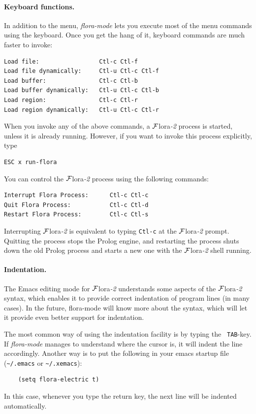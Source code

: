 \documentclass[11pt]{article}
\newcommand{\FLORA}{{\mbox{\sc ${\cal F}${lora}\rm\emph{-2}}}\xspace}
\begin{document}
\paragraph{Keyboard functions.}
In addition to the menu, \emph{flora-mode} lets you execute most of the
menu commands using the keyboard. Once you get the hang of it, keyboard
commands are much faster to invoke:
\begin{verbatim}
Load file:                 Ctl-c Ctl-f
Load file dynamically:     Ctl-u Ctl-c Ctl-f
Load buffer:               Ctl-c Ctl-b
Load buffer dynamically:   Ctl-u Ctl-c Ctl-b
Load region:               Ctl-c Ctl-r
Load region dynamically:   Ctl-u Ctl-c Ctl-r
\end{verbatim}
When you invoke any of the above commands, a \FLORA process is started,
unless it is already running. However, if you want to invoke this process
explicitly, type
\begin{verbatim}
ESC x run-flora  
\end{verbatim}
You can control the \FLORA process using the following commands:
\begin{verbatim}
Interrupt Flora Process:      Ctl-c Ctl-c
Quit Flora Process:           Ctl-c Ctl-d
Restart Flora Process:        Ctl-c Ctl-s
\end{verbatim}
Interrupting \FLORA is equivalent to typing {\tt Ctl-c} at the \FLORA
prompt. Quitting the process stops the Prolog engine, and restarting the
process shuts down the old Prolog process and starts a new one with the \FLORA
shell running. 

\paragraph{Indentation.}
The Emacs editing mode for \FLORA
understands some aspects of the \FLORA syntax, which
enables it to provide correct indentation of program lines (in many cases).
In the future, flora-mode will know more about the syntax, which will let
it provide even better support for indentation.

The most common way of using the indentation facility is by typing the {\tt
  TAB}-key. If \emph{flora-mode} manages to understand where the cursor is,
it will indent the line accordingly. Another way is to put the following in
your emacs startup file (\verb|~/.emacs| or \verb|~/.xemacs|):
\begin{verbatim}
    (setq flora-electric t)  
\end{verbatim}
In this case, whenever you type the return key, the next line will be
indented automatically.
\end{document}
